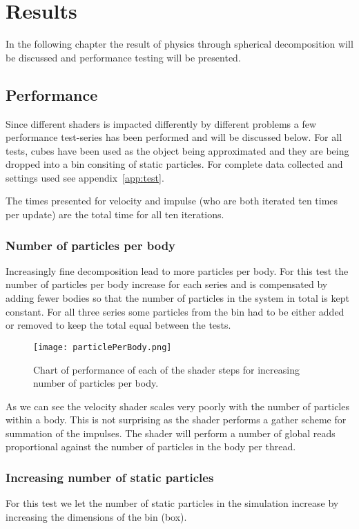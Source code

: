 \chapter{Results}
In the following chapter the result of physics through spherical decomposition will
be discussed and performance testing will be presented.

\section{Performance}
Since different shaders is impacted differently by different problems a few performance
test-series has been performed and will be discussed below.
For all tests, cubes have been used as the object being approximated and they
are being dropped into a bin consiting of static particles. For complete data collected and
settings used see appendix~\ref{app:test}.

The times presented for velocity and impulse (who are both iterated ten times per update)
 are the total time for all ten iterations.

\subsection{Number of particles per body}
Increasingly fine decomposition lead to more particles per body.
For this test the number of particles per body increase for each series and is
compensated by adding fewer bodies so that the number of particles in the system
in total is kept constant. For all three series some particles from the bin had to be
either added or removed to keep the total equal between the tests.
\begin{figure}[H]
  \centering
  \texttt{[image: particlePerBody.png]}
  \caption{Chart of performance of each of the shader steps for increasing number of particles per body.}
  \label{fig:particlePerBody}
\end{figure}
As we can see the velocity shader scales very poorly with the number of particles
within a body. This is not surprising as the shader performs a gather scheme for
summation of the impulses. The shader will perform a number of global reads proportional
against the number of particles in the body per thread.

\subsection{Increasing number of static particles}
For this test we let the number of static particles in the simulation increase
by increasing the dimensions of the bin (box).

